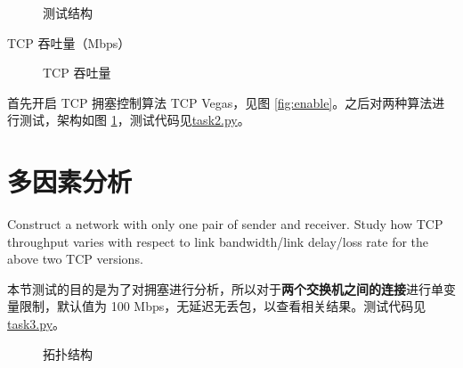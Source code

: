     \noindent
    \begin{minipage}{0.4\textwidth}
        \begin{figure}[H]
            \centering
            
            \caption{测试结构}\label{fig:task2topo}
        \end{figure}
        \begin{table}[H]
            \centering
            \caption{TCP 吞吐量（Mbps）}
        \end{table}
    \end{minipage}
    \begin{minipage}{0.6\textwidth}
        \begin{figure}[H]
            \caption{TCP 吞吐量}
        \end{figure}
    \end{minipage}

    首先开启 TCP 拥塞控制算法 TCP Vegas，见图 \ref{fig:enable}。之后对两种算法进行测试，架构如图 \ref{fig:task2topo}，测试代码见\href{./task2.py}{\ttfamily task2.py}。

    \section{多因素分析}
    Construct a network with only one pair of sender and receiver. Study how TCP throughput varies with respect to link bandwidth/link delay/loss rate for the above two TCP versions.

   本节测试的目的是为了对拥塞进行分析，所以对于\textbf{两个交换机之间的连接}进行单变量限制，默认值为 100 Mbps，无延迟无丢包，以查看相关结果。测试代码见 \href{./task3.py}{\ttfamily task3.py}。

   \begin{figure}[H]
       \centering
       
       \caption{拓扑结构}\label{fig:task3topo}
   \end{figure}

